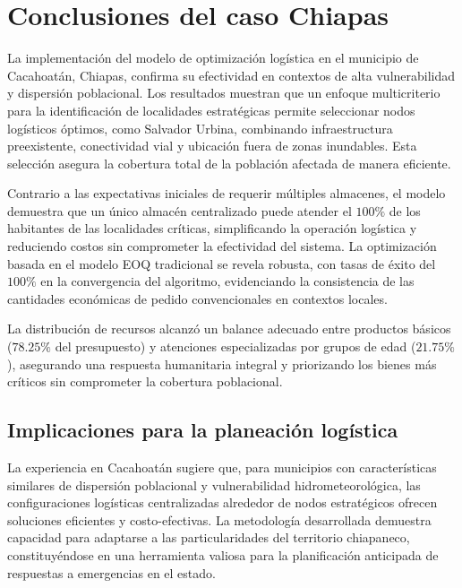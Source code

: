 \documentclass[
  spanish,
  us-letterpaper,
]{scrreprt}
\numberwithin{equation}{section}
\begin{document}
\section{Conclusiones del caso
Chiapas}\label{conclusiones-del-caso-chiapas}

La implementación del modelo de optimización logística en el municipio
de Cacahoatán, Chiapas, confirma su efectividad en contextos de alta
vulnerabilidad y dispersión poblacional. Los resultados muestran que un
enfoque multicriterio para la identificación de localidades estratégicas
permite seleccionar nodos logísticos óptimos, como Salvador Urbina,
combinando infraestructura preexistente, conectividad vial y ubicación
fuera de zonas inundables. Esta selección asegura la cobertura total de
la población afectada de manera eficiente.

Contrario a las expectativas iniciales de requerir múltiples almacenes,
el modelo demuestra que un único almacén centralizado puede atender el
\(100\%\) de los habitantes de las localidades críticas, simplificando
la operación logística y reduciendo costos sin comprometer la
efectividad del sistema. La optimización basada en el modelo EOQ
tradicional se revela robusta, con tasas de éxito del \(100\%\) en la
convergencia del algoritmo, evidenciando la consistencia de las
cantidades económicas de pedido convencionales en contextos locales.

La distribución de recursos alcanzó un balance adecuado entre productos
básicos (\(78.25\%\) del presupuesto) y atenciones especializadas por
grupos de edad (\(21.75\%\)), asegurando una respuesta humanitaria
integral y priorizando los bienes más críticos sin comprometer la
cobertura poblacional.

\subsection{Implicaciones para la planeación
logística}\label{implicaciones-para-la-planeaciuxf3n-loguxedstica}

La experiencia en Cacahoatán sugiere que, para municipios con
características similares de dispersión poblacional y vulnerabilidad
hidrometeorológica, las configuraciones logísticas centralizadas
alrededor de nodos estratégicos ofrecen soluciones eficientes y
costo-efectivas. La metodología desarrollada demuestra capacidad para
adaptarse a las particularidades del territorio chiapaneco,
constituyéndose en una herramienta valiosa para la planificación
anticipada de respuestas a emergencias en el estado.
\end{document}
